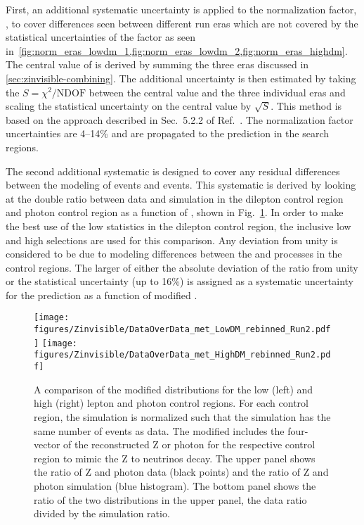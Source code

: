 First, an additional systematic uncertainty is applied to the normalization factor, \Rz, to cover differences seen between different run eras which are not covered by the statistical uncertainties of the factor as seen in~\cref{fig:norm_eras_lowdm_1,fig:norm_eras_lowdm_2,fig:norm_eras_highdm}.
The central value of \Rz is derived by summing the three eras discussed in \cref{sec:zinvisible-combining}.
The additional uncertainty is then estimated by taking the $S=\chi^2/\text{NDOF}$ between the central value and the three individual eras and scaling the statistical uncertainty on the central value by $\sqrt{S}$.
This method is based on the approach described in Sec.~5.2.2 of Ref.~\cite{PDG2018}.
The \RZ normalization factor uncertainties are 4--14\% and are propagated to the \znunu prediction in the search regions.

The second additional \znunu systematic is designed to cover any residual differences between the modeling of \zjets events and \gjets events.
This systematic is derived by looking at the double ratio between data and simulation in the dilepton control region and photon control region as a function of \ptmiss, shown in Fig.~\ref{fig:z_vs_photon_met}.
In order to make the best use of the low statistics in the dilepton control region, the inclusive low \dm and high \dm selections are used for this comparison.
Any deviation from unity is considered to be due to modeling differences between the \zjets and \gjets processes in the control regions.
The larger of either the absolute deviation of the ratio from unity or the statistical uncertainty (up to 16\%) is assigned as a systematic uncertainty for the \znunu prediction as a function of modified \ptmiss.

\begin{figure}[tbp]
{
\centering
\texttt{[image: figures/Zinvisible/DataOverData\_met\_LowDM\_rebinned\_Run2.pdf]}
\texttt{[image: figures/Zinvisible/DataOverData\_met\_HighDM\_rebinned\_Run2.pdf]}
\caption[A comparison of the modified \met distributions for the low \dm and high \dm lepton and photon control regions]
{
    A comparison of the modified \met distributions for the low \dm (left) and high \dm (right) lepton and photon control regions.
    For each control region, the simulation is normalized such that the simulation has the same number of events as data.
    The modified \met includes the four-vector of the reconstructed Z or photon for the respective control region to mimic the Z to neutrinos decay.
    The upper panel shows the ratio of Z and photon data (black points) and the ratio of Z and photon simulation (blue histogram).
    The bottom panel shows the ratio of the two distributions in the upper panel, the data ratio divided by the simulation ratio.
}
\label{fig:z_vs_photon_met}
}
\end{figure}

